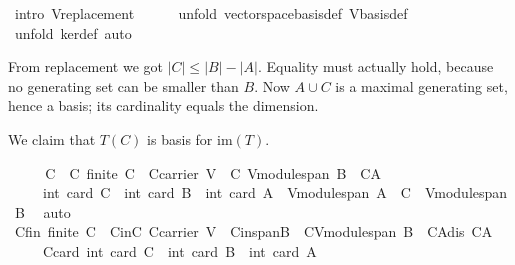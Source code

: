 \begin{isabellebody}
\ {\isacharparenleft}intro\ V{\isachardot}replacement{\isacharparenright}\isanewline
\ \ \ \ \isamarkupfalse%
\ {\isacharparenleft}unfold\ vectorspace{\isachardot}basis{\isacharunderscore}def\ V{\isachardot}basis{\isacharunderscore}def{\isacharparenright}\isanewline
\ \ \ \ \ \ \isamarkupfalse%
\ {\isacharparenleft}unfold\ ker{\isacharunderscore}def{\isacharcomma}\ auto{\isacharparenright}%
\begin{isamarkuptxt}%
From replacement we got $|C|\leq |B|-|A|$. Equality must actually hold, because no generating set
can be smaller than $B$. Now $A\cup C$ is a maximal generating set, hence a basis; its cardinality
equals the dimension.%
\end{isamarkuptxt}%
\isamarkuptrue%
%
\begin{isamarkuptxt}%
We claim that $T(C)$ is basis for $\text{im}(T)$.%
\end{isamarkuptxt}%
\isamarkuptrue%
\ \ \isamarkupfalse%
\ \isamarkupfalse%
\ C\ \ C{\isacharcolon}\ {\isachardoublequoteopen}finite\ C\ {\isasymand}\ C{\isasymsubseteq}carrier\ V\ {\isasymand}\ C{\isasymsubseteq}\ V{\isachardot}module{\isachardot}span\ B\ {\isasymand}\ C{\isasyminter}A{\isacharequal}{\isacharbraceleft}{\isacharbraceright}\ \isanewline
\ \ \ \ {\isasymand}\ int\ {\isacharparenleft}card\ C{\isacharparenright}\ {\isasymle}\ {\isacharparenleft}int\ {\isacharparenleft}card\ B{\isacharparenright}{\isacharparenright}\ {\isacharminus}\ {\isacharparenleft}int\ {\isacharparenleft}card\ A{\isacharparenright}{\isacharparenright}\ {\isasymand}\ {\isacharparenleft}V{\isachardot}module{\isachardot}span\ {\isacharparenleft}A\ {\isasymunion}\ C{\isacharparenright}\ {\isacharequal}\ V{\isachardot}module{\isachardot}span\ B{\isacharparenright}{\isachardoublequoteclose}\ \isamarkupfalse%
\ auto\isanewline
\ \ \isamarkupfalse%
\ Cfin{\isacharcolon}\ {\isachardoublequoteopen}finite\ C{\isachardoublequoteclose}\ \ CinC{\isacharcolon}\ {\isachardoublequoteopen}C{\isasymsubseteq}carrier\ V{\isachardoublequoteclose}\ \ CinspanB{\isacharcolon}\ {\isachardoublequoteopen}\ C{\isasymsubseteq}V{\isachardot}module{\isachardot}span\ B{\isachardoublequoteclose}\ \ CAdis{\isacharcolon}\ {\isachardoublequoteopen}C{\isasyminter}A{\isacharequal}{\isacharbraceleft}{\isacharbraceright}{\isachardoublequoteclose}\ \isanewline
\ \ \ \ \ Ccard{\isacharcolon}\ {\isachardoublequoteopen}int\ {\isacharparenleft}card\ C{\isacharparenright}\ {\isasymle}\ {\isacharparenleft}int\ {\isacharparenleft}card\ B{\isacharparenright}{\isacharparenright}\ {\isacharminus}\ {\isacharparenleft}int\ {\isacharparenleft}card\ A{\isacharparenright}{\isacharparenright}{\isachardoublequoteclose}\isanewline

\end{isabellebody}

